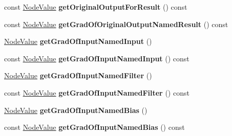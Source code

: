 \begin{DoxyCompactItemize}
\mbox{\label{classglow_1_1_convolution_grad_node_aa2049c9044967d1009fd4f3b882eff40}} 
const \hyperlink{structglow_1_1_node_value}{Node\+Value} {\bfseries get\+Original\+Output\+For\+Result} () const
\item 
\mbox{\label{classglow_1_1_convolution_grad_node_ae5a9195bc3eb5728c9ea3dfa99663bf7}} 
const \hyperlink{structglow_1_1_node_value}{Node\+Value} {\bfseries get\+Grad\+Of\+Original\+Output\+Named\+Result} () const
\item 
\mbox{\label{classglow_1_1_convolution_grad_node_aef9202a08719c77ea4a8496d6f498dbb}} 
\hyperlink{structglow_1_1_node_value}{Node\+Value} {\bfseries get\+Grad\+Of\+Input\+Named\+Input} ()
\item 
\mbox{\label{classglow_1_1_convolution_grad_node_a2d5af9a1ff577f1520a7111ee6b1e1c1}} 
const \hyperlink{structglow_1_1_node_value}{Node\+Value} {\bfseries get\+Grad\+Of\+Input\+Named\+Input} () const
\item 
\mbox{\label{classglow_1_1_convolution_grad_node_a8440a172545104098e1bd7ffe12023f4}} 
\hyperlink{structglow_1_1_node_value}{Node\+Value} {\bfseries get\+Grad\+Of\+Input\+Named\+Filter} ()
\item 
\mbox{\label{classglow_1_1_convolution_grad_node_a55d29ba2b5ae1a9e5e5a01a3e54eb660}} 
const \hyperlink{structglow_1_1_node_value}{Node\+Value} {\bfseries get\+Grad\+Of\+Input\+Named\+Filter} () const
\item 
\mbox{\label{classglow_1_1_convolution_grad_node_a5139200b3aa20137f60998221cacbfef}} 
\hyperlink{structglow_1_1_node_value}{Node\+Value} {\bfseries get\+Grad\+Of\+Input\+Named\+Bias} ()
\item 
\mbox{\label{classglow_1_1_convolution_grad_node_af9921361a92e8f88cc90cfae776c4632}} 
const \hyperlink{structglow_1_1_node_value}{Node\+Value} {\bfseries get\+Grad\+Of\+Input\+Named\+Bias} () const
\item 

\end{DoxyCompactItemize}
